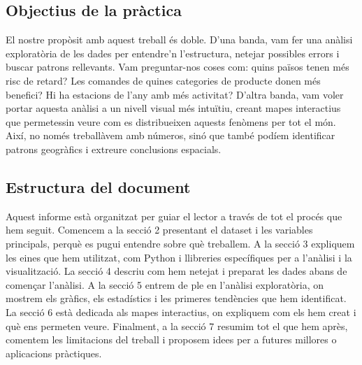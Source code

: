 \documentclass[12pt,a4paper]{article}
\begin{document}
\subsection{Objectius de la pràctica}
El nostre propòsit amb aquest treball és doble. D’una banda, vam fer una anàlisi exploratòria de les dades per entendre’n l’estructura, netejar possibles errors i buscar patrons rellevants. Vam preguntar-nos coses com: quins països tenen més risc de retard? Les comandes de quines categories de producte donen més benefici? Hi ha estacions de l’any amb més activitat? D’altra banda, vam voler portar aquesta anàlisi a un nivell visual més intuïtiu, creant mapes interactius que permetessin veure com es distribueixen aquests fenòmens per tot el món. Així, no només treballàvem amb números, sinó que també podíem identificar patrons geogràfics i extreure conclusions espacials.
\subsection{Estructura del document}
Aquest informe està organitzat per guiar el lector a través de tot el procés que hem seguit. Comencem a la secció 2 presentant el dataset i les variables principals, perquè es pugui entendre sobre què treballem. A la secció 3 expliquem les eines que hem utilitzat, com Python i llibreries específiques per a l’anàlisi i la visualització. La secció 4 descriu com hem netejat i preparat les dades abans de començar l’anàlisi. A la secció 5 entrem de ple en l’anàlisi exploratòria, on mostrem els gràfics, els estadístics i les primeres tendències que hem identificat. La secció 6 està dedicada als mapes interactius, on expliquem com els hem creat i què ens permeten veure. Finalment, a la secció 7 resumim tot el que hem après, comentem les limitacions del treball i proposem idees per a futures millores o aplicacions pràctiques.

\newpage

\end{document}

